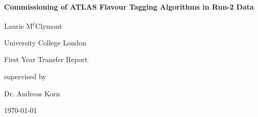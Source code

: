 \documentclass[12pt, onecolumn,notitlepage]{article}
\begin{document}

    \begin{center}
    \vspace*{3cm}
    {\huge\bfseries Commissioning of ATLAS Flavour Tagging Algorithms in Run-2 Data \par}
    \vspace{2cm}
    {\Large Laurie M\textsuperscript{c}Clymont \par} 
    \vspace{0.5cm}
    {\Large University College London \par}
    {\Large First Year Transfer Report \par}
    \vspace{0.5cm}
    {\scshape\Large \par}
    {\large supervised by\par
    \Large Dr. Andreas Korn}
    
    \vspace{1.5cm}
    
    \begin{abstract}    
         \normalsize
         The identification of jets containing \textit{b}-hadrons or \textit{c}-hadrons, known as flavour tagging,
         is an important part of the Run-2 physics program at the ATLAS experiment.
         For example it features in searches for beyond standard model physics,
         such as the proposed analysis using the dijet mass spectrum of
         two \textit{b}-tagged jets presented in this report.
         For Run-2, there have been many changes that affect flavour tagging; the increase in centre-of-mass energy, the introduction of a new inner-most tracking layer 
         and changes to the algorithms used for flavour tagging.
         In this report flavour tagging in Run-2 is validated by comparing distributions of
         variables relevant to flavour tagging in early Run-2 data from ATLAS to Monte Carlo simulation.
         Also presented in this report is a study into improving high-$p_T$ \textit{b}-tagging by introducing a new track-$p_T$ cut that depends on
         jet-$p_T$.
         
    \end{abstract}



    \vfill

    {\large \today\par}
    \end{center}
\newpage
\end{document}
